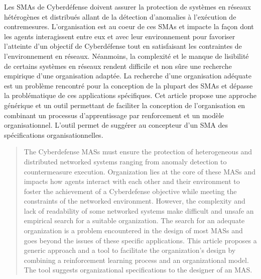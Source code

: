 \documentclass[contribution]{jfsma}
\begin{document}
\maketitle

\begin{resume}

  Les SMAs de Cyberdéfense doivent assurer la protection de systèmes en réseaux hétérogènes et distribués allant de la détection d’anomalies à l’exécution de contremesures. 
  L’organisation est au coeur de ces SMAs et impacte la façon dont les agents interagissent entre eux et avec leur environnement pour favoriser l’atteinte d’un objectif de Cyberdéfense tout en satisfaisant les contraintes de l’environnement en réseaux.
  Néanmoins, la complexité et le manque de lisibilité de certains systèmes en réseaux rendent difficile et non sûre une recherche empirique d’une organisation adaptée.
  La recherche d’une organisation adéquate est un problème  rencontré pour la conception de la plupart des SMAs et dépasse la problématique de ces applications spécifiques.
  Cet article propose une approche générique et un outil permettant de faciliter la conception de l’organisation en combinant un processus d’apprentissage par renforcement et un modèle organisationnel. L’outil permet de suggérer au concepteur d’un SMA des spécifications organisationnelles.
  
\end{resume}


\bigskip

\begin{abstract}

  The Cyberdefense MASs must ensure the protection of heterogeneous and distributed networked systems ranging from anomaly detection to countermeasure execution.
  Organization lies at the core of these MASs and impacts how agents interact with each other and their environment to foster the achievement of a Cyberdefense objective while meeting the constraints of the networked environment.
  However, the complexity and lack of readability of some networked systems make difficult and unsafe an empirical search for a suitable organization.
  The search for an adequate organization is a problem encountered in the design of most MASs and goes beyond the issues of these specific applications.
  This article proposes a generic approach and a tool to facilitate the organization's design by combining a reinforcement learning process and an organizational model. The tool suggests organizational specifications to the designer of an MAS.
\end{abstract}
\end{document}
